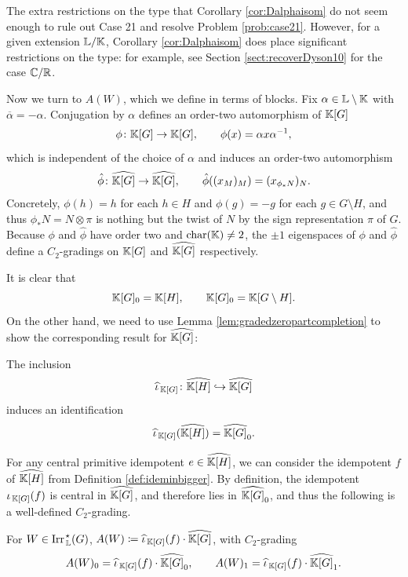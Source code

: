 \begin{eg}
The extra restrictions on the type that Corollary \ref{cor:Dalphaisom} do not seem enough to rule out Case 21 and resolve Problem \ref{prob:case21}. However, for a given extension ${\mathbb L} / {\mathbb K}$, Corollary \ref{cor:Dalphaisom} does place significant restrictions on the type: for example, see Section \ref{sect:recoverDyson10} for the case ${\mathbb C} / {\mathbb R}$.
\end{eg}

Now we turn to $A(W)$, which we define in terms of blocks. Fix $\alpha \in {\mathbb L} \setminus {\mathbb K}$ with $\overline{\alpha} = - \alpha$. Conjugation by $\alpha$ defines an order-two automorphism of ${\mathbb K}[G]$
\[
\phi \colon {\mathbb K}[G] \rightarrow {\mathbb K}[G], \qquad \phi(x) = \alpha x \alpha^{-1},
\]
which is independent of the choice of $\alpha$ and induces an order-two automorphism 
\[
\hat{\phi} \colon \widehat{{\mathbb K}[G]} \rightarrow \widehat{{\mathbb K}[G]}, \qquad \hat{\phi}((x_M)_M) = (x_{\phi_* N})_N.
\]
Concretely, $\phi(h) = h$ for each $h \in H$ and $\phi(g) = - g$ for each $g \in G \setminus H$, and thus $\phi_* N = N \otimes \pi$ is nothing but the twist of $N$ by the sign representation $\pi$ of $G$. Because $\phi$ and $\widehat{\phi}$ have order two and $\operatorname{char}({\mathbb K}) \neq 2$, the $\pm 1$ eigenspaces of $\phi$ and $\hat{\phi}$ define a $C_2$-gradings on ${\mathbb K}[G]$ and $\widehat{{\mathbb K}[G]}$ respectively.

It is clear that 
\[
{\mathbb K}[G]_0 = {\mathbb K}[H], \qquad {\mathbb K}[G]_0 = {\mathbb K}[G \setminus H].
\]
On the other hand, we need to use Lemma \ref{lem:gradedzeropartcompletion} to show the corresponding result for $\widehat{{\mathbb K}[G]}$:

\begin{cor}\label{cor:degzeropartofcompletion}
    The inclusion
    \[
    \widehat{\iota}_{\, {\mathbb K}[G]} \colon \widehat{{\mathbb K}[H]} \hookrightarrow \widehat{{\mathbb K}[G]}
    \]
    induces an identification
    \[
    \widehat{\iota}_{\, {\mathbb K}[G]}(\widehat{{\mathbb K}[H]}) = \widehat{{\mathbb K}[G]}_0.
    \]
\end{cor}

For any central primitive idempotent $e \in \widehat{{\mathbb K}[H]}$, we can consider the idempotent $f$ of $\widehat{{\mathbb K}[H]}$ from Definition \ref{def:ideminbigger}. By definition, the idempotent $\iota_{\, {\mathbb K}[G]}(f)$ is central in $\widehat{{\mathbb K}[G]}$, and therefore lies in $\widehat{{\mathbb K}[G]}_0$, and thus the following is a well-defined $C_2$-grading.

\begin{defn}
    For $W \in \operatorname{Irr}_{\, {\mathbb L}}^{\hspace{0.1em} \star}(G)$, $A(W) \coloneqq \widehat{\iota}_{\, {\mathbb K}[G]}(f) \cdot \widehat{{\mathbb K}[G]}$, with $C_2$-grading
    \[
        A(W)_0 = \widehat{\iota}_{\, {\mathbb K}[G]}(f) \cdot \widehat{{\mathbb K}[G]}_0, \qquad A(W)_1 = \widehat{\iota}_{\, {\mathbb K}[G]}(f) \cdot \widehat{{\mathbb K}[G]}_1.
    \]
\end{defn}


